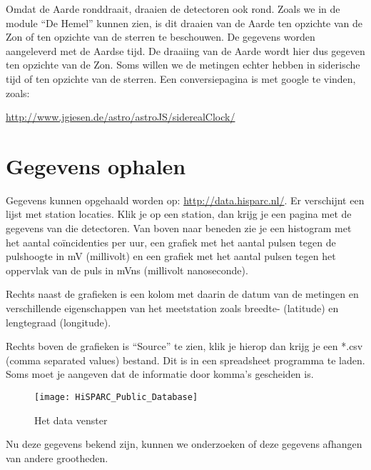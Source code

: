 Omdat de Aarde ronddraait, draaien de detectoren ook rond. Zoals we
in de module {}``De Hemel'' kunnen zien, is dit draaien van de Aarde
ten opzichte van de Zon of ten opzichte van de sterren te beschouwen.
De gegevens worden aangeleverd met de Aardse tijd. De draaiing van
de Aarde wordt hier dus gegeven ten opzichte van de Zon. Soms willen
we de metingen echter hebben in siderische tijd of ten opzichte van
de sterren. Een conversiepagina is met google te vinden, zoals:

\url{http://www.jgiesen.de/astro/astroJS/siderealClock/}


\section{Gegevens ophalen}

Gegevens kunnen opgehaald worden op: \url{http://data.hisparc.nl/}. Er
verschijnt een lijst met station locaties. Klik je op een station, dan
krijg je een pagina met de gegevens van die detectoren. Van boven naar
beneden zie je een histogram met het aantal coïncidenties per uur, een
grafiek met het aantal pulsen tegen de pulshoogte in mV (millivolt) en
een grafiek met het aantal pulsen tegen het oppervlak van de puls in
mVns (millivolt nanoseconde).

Rechts naast de grafieken is een kolom met daarin de datum van de
metingen en verschillende eigenschappen van het meetstation zoals
breedte- (latitude) en lengtegraad (longitude).

Rechts boven de grafieken is {}``Source'' te zien, klik je hierop
dan krijg je een {*}.csv (comma separated values) bestand. Dit is
in een spreadsheet programma te laden. Soms moet je aangeven dat de
informatie door komma's gescheiden is.

\begin{figure}[h]
\centering

\texttt{[image: HiSPARC\_Public\_Database]}

\caption{Het data venster}
\end{figure}


Nu deze gegevens bekend zijn, kunnen we onderzoeken of deze gegevens
afhangen van andere grootheden. 


